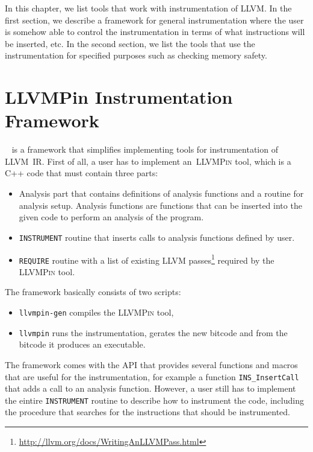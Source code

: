 In this chapter, we list tools that work with instrumentation of LLVM. In the
first section, we describe a framework for general instrumentation where the
user is somehow able to control the instrumentation in terms of what
instructions will be inserted, etc. In the second section, we list the tools
that use the instrumentation for specified purposes such as checking memory
safety.

\section{LLVMPin Instrumentation Framework}\label{sec:llvmpin}

\llvmpin~\cite{llvmpin} is a framework that simplifies implementing tools for
instrumentation of LLVM~IR. First of all, a user has to implement
an~\textsc{LLVMPin} tool, which is a C++ code that must contain three parts:

\begin{itemize}
    \item Analysis part that contains definitions of analysis functions and a
    routine for analysis setup. Analysis functions are functions that can be
    inserted into the given code to perform an analysis of the program.
    \item \texttt{INSTRUMENT} routine that inserts calls to analysis functions
    defined by user.
    \item \texttt{REQUIRE} routine with a list of existing LLVM
    passes\footnote{\url{http://llvm.org/docs/WritingAnLLVMPass.html}} required
    by the \textsc{LLVMPin} tool.
\end{itemize}

The framework basically consists of two scripts:

\begin{itemize}
    \item \texttt{llvmpin-gen} compiles the \textsc{LLVMPin} tool,
    \item \texttt{llvmpin} runs the instrumentation, gerates the new bitcode
    and from the bitcode it produces an executable.
\end{itemize}

The framework comes with the API that provides several functions and macros
that are useful for the instrumentation, for example a function
\texttt{INS\_InsertCall} that adds a call to an analysis function. However, a
user still has to implement the eintire \texttt{INSTRUMENT} routine to describe
how to instrument the code, including the procedure that searches for the
instructions that should be instrumented.

